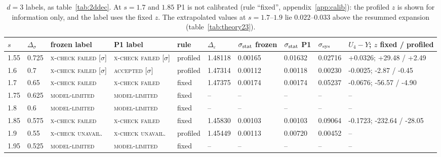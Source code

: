 \documentclass[10pt,a4paper]{article}
\newcommand{\Ds}{\Delta_\sigma}
\newcommand{\De}{\Delta_\varepsilon}
\newcommand{\lbl}[1]{{\mdseries\scshape #1}}
\newcommand{\sstat}{\sigma_{\rm stat}}
\newcommand{\ssys}{\sigma_{\rm sys}}
\begin{document}
\begin{table}[htbp]\centering\scriptsize
\caption{$d=3$ labels, as table~\ref{tab:2ddec}. At $s=1.7$ and $1.85$ P1 is not calibrated (rule ``fixed'', appendix~\ref{app:calib}): the
profiled $z$ is shown for information only, and the label uses the fixed $z$. The extrapolated values at $s=1.7$--$1.9$ lie $0.022$--$0.033$
above the resummed expansion (table~\ref{tab:theory23}).}\label{tab:3ddec}
\setlength{\tabcolsep}{4pt}\begin{tabular}{@{}llllllllll@{}}\toprule
$s$ & $\Ds$ & frozen label & P1 label & rule & $\De$ & $\sstat$ frozen & $\sstat$ P1 & $\ssys$ & $U_4-Y$; $z$ fixed / profiled \\\midrule
1.55 & 0.725 & \lbl{x-check failed} [$\sigma$] & \lbl{x-check failed} [$\sigma$] & profiled & 1.48118 & 0.00165 & 0.01632 & 0.02716 & +0.0326; +29.48 / +2.49 \\
1.6 & 0.7 & \lbl{x-check failed} [$\sigma$] & \lbl{accepted} [$\sigma$] & profiled & 1.47314 & 0.00112 & 0.00118 & 0.00230 & -0.0025; -2.87 / -0.45 \\
1.7 & 0.65 & \lbl{x-check failed} & \lbl{x-check failed} & fixed & 1.47375 & 0.00174 & 0.00174 & 0.05237 & -0.0676; -56.57 / -4.90 \\
1.75 & 0.625 & \lbl{model-limited} & \lbl{model-limited} & fixed & -- & -- & -- & -- & -- \\
1.8 & 0.6 & \lbl{model-limited} & \lbl{model-limited} & fixed & -- & -- & -- & -- & -- \\
1.85 & 0.575 & \lbl{x-check failed} & \lbl{x-check failed} & fixed & 1.45830 & 0.00103 & 0.00103 & 0.09064 & -0.1723; -232.64 / -28.05 \\
1.9 & 0.55 & \lbl{x-check unavail.} & \lbl{x-check unavail.} & profiled & 1.45449 & 0.00113 & 0.00720 & 0.00452 & -- \\
1.95 & 0.525 & \lbl{model-limited} & \lbl{model-limited} & fixed & -- & -- & -- & -- & -- \\
\bottomrule\end{tabular}
\end{table}
\end{document}
